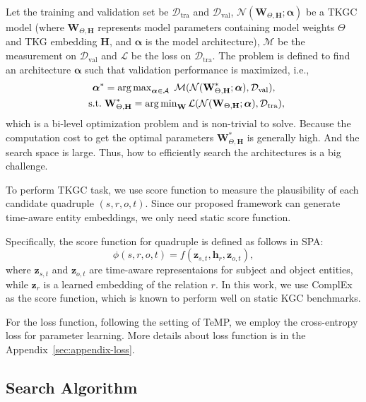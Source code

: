 \documentclass[11pt]{article}
\def\bW{\textbf{W}}
\def\bal{\bm{\alpha}}
\DeclareMathOperator*{\argmin}{arg\,min}
\DeclareMathOperator*{\argmax}{arg\,max}
\begin{document}
Let the training and validation set be 
$\mathcal{D}_\text{tra}$ and $\mathcal{D}_\text{val}$,
$\mathcal{N}(\bW_{\Theta,\mathbf{H}};\bal)$ be a TKGC model 
(where $\bW_{\Theta,\mathbf{H}}$ represents model parameters containing model weights $\Theta$ and TKG embedding $\mathbf{H}$,
and $\bal$ is the model architecture),
$\mathcal{M}$ be the measurement on $\mathcal{D}_\text{val}$
and $\mathcal{L}$ be the loss on $\mathcal{D}_\text{tra}$.
The problem is defined to find an architecture $\bal$ 
such that validation performance is maximized, i.e.,
\begin{align}
	\bal^* &= \argmax\nolimits_{\bal \in \mathcal{A}}\;
	\mathcal{M} (\mathcal{N}(\bW_{\Theta,\mathbf{H}}^*;\bal), \mathcal{D}_\text{val}),
	\label{eq-nested-nas-opt}
	\\\
	\text{\;s.t.\;}&\bW_{\Theta,\mathbf{H}}^*
	= \argmin\nolimits_\bW \mathcal{L}(\mathcal{N}(\bW_{\Theta,\mathbf{H}};\bal), \mathcal{D}_\text{tra}),
	\label{eq-nested-nas-opt:2}
\end{align}
which is a bi-level optimization problem and is non-trivial to solve. 
Because the computation cost to get the optimal parameters $\bW_{\Theta,\mathbf{H}}^*$ is generally high.
And the search space is large.
Thus, 
how to efficiently search the architectures is a big challenge.

To perform TKGC task, 
we use score function to measure the plausibility of each candidate quadruple $(s, r, o, t)$.
Since our proposed framework can generate time-aware entity embeddings,
we only need static score function.

Specifically, 
the score function for quadruple is defined as follows in SPA:
\begin{equation}\label{equ-decoder}
	\phi(s, r, o, t)= f(\bm{z}_{s, t}, \bm{h}_r, \bm{z}_{o, t}),
\end{equation}
where $\bm{z}_{s, t}$ and $\bm{z}_{o, t}$ are time-aware representaions for subject and object entities, while $\bm{z}_r$ is a learned embedding of the relation $r$. 
In this work, 
we use ComplEx \citep{trouillon2016complex} as the score function, 
which is known to perform well on static KGC benchmarks.

For the loss function,
following the setting of TeMP,
we employ the cross-entropy loss for parameter learning.
More details about loss function is in the Appendix~\ref{sec:appendix-loss}.

\subsection{Search Algorithm}\label{sec-search-algorithm}
 
\end{document}
